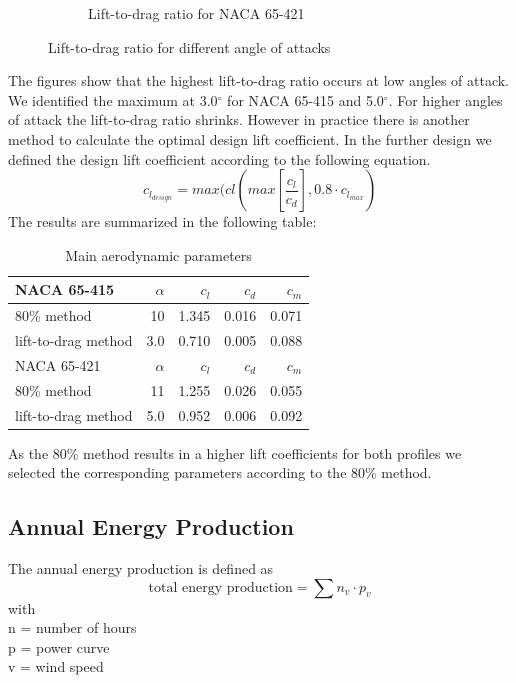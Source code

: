 \documentclass[10pt]{article}
\begin{document}
\begin{figure}[htb!]
\begin{subfigure}{0.5\textwidth}
  \caption{Lift-to-drag ratio for NACA 65-421}
\end{subfigure}
\caption{Lift-to-drag ratio for different angle of attacks}
\label{fig:comparison_lift_to_drag}
\end{figure}

The figures show that the highest lift-to-drag ratio occurs at low angles of attack. We identified the maximum at 3.0$^\circ$ for NACA 65-415 and 5.0$^\circ$. For higher angles of attack the lift-to-drag ratio shrinks. However in practice there is another method to calculate the optimal design lift coefficient. In the further design we defined the design lift coefficient according to the following equation.
\begin{equation}
c_{l_{design}} = max(cl(max[\frac{c_l}{c_d}], 0.8\cdot c_{l_{max}})
\end{equation}
The results are summarized in the following table:\\
\begin{table}[H]
\begin{tabular}{l | r r r r}
NACA 65-415 & $\alpha$ &$c_l$ &$c_d$ & $c_m$\\
\hline
80\% method& 10 & 1.345 & 0.016 & 0.071\\
lift-to-drag method & 3.0 & 0.710 & 0.005 &  0.088\\
\hline
NACA 65-421 & $\alpha$ &$c_l$ &$c_d$ & $c_m$\\
\hline
80\% method& 11 & 1.255 & 0.026 & 0.055\\
lift-to-drag method & 5.0 & 0.952 & 0.006 &  0.092\\
\end{tabular}
\caption{Main aerodynamic parameters}
\end{table}

As the 80\% method results in a higher lift coefficients for both profiles we selected the corresponding parameters according to the 80\% method.
\newpage
\subsection{Annual Energy Production}
The annual energy production is defined as 
\begin{equation}
\text{total energy production} = \sum n_v \cdot p_v
\end{equation}
with\\
n = number of hours \\
p = power curve\\
v = wind speed\\
\end{document}
